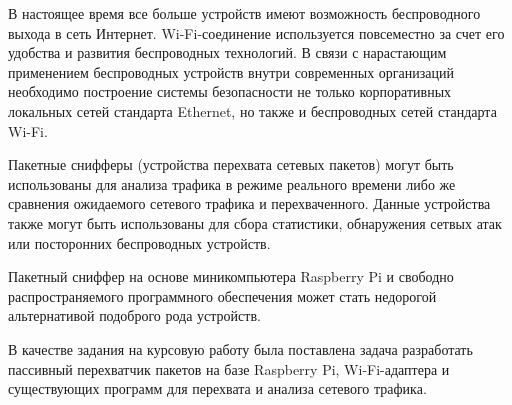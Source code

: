 В настоящее время все больше устройств имеют возможность беспроводного выхода в сеть Интернет. Wi-Fi-соединение используется повсеместно за счет его удобства и развития беспроводных технологий. В связи с нарастающим применением беспроводных устройств внутри современных организаций необходимо построение системы безопасности не только корпоративных локальных сетей стандарта Ethernet, но также и беспроводных сетей стандарта Wi-Fi. 

Пакетные снифферы (устройства перехвата сетевых пакетов) могут быть использованы для анализа трафика в режиме реального времени либо же сравнения ожидаемого сетевого трафика и перехваченного. Данные устройства также могут быть использованы для сбора статистики, обнаружения сетвых атак или посторонних беспроводных устройств.

Пакетный сниффер на основе миникомпьютера Raspberry Pi и свободно распространяемого программного обеспечения может стать недорогой альтернативой подоброго рода устройств. 

В качестве задания на курсовую работу была поставлена задача разработать пассивный перехватчик пакетов на базе Raspberry Pi, Wi-Fi-адаптера и существующих программ для перехвата и анализа сетевого трафика.
